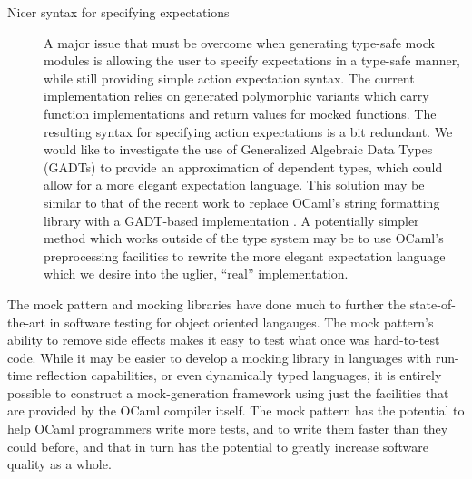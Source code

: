 \begin{description}
\item [Nicer syntax for specifying expectations]

  A major issue that must be overcome when generating type-safe mock
  modules is allowing the user to specify expectations in a type-safe
  manner, while still providing simple action expectation syntax. The
  current implementation relies on generated polymorphic variants
  which carry function implementations and return values for mocked
  functions. The resulting syntax for specifying action expectations
  is a bit redundant. We would like to investigate the use of
  Generalized Algebraic Data Types (GADTs) to provide an approximation
  of dependent types, which could allow for a more elegant expectation
  language. This solution may be similar to that of the recent work to
  replace OCaml's string formatting library with a GADT-based
  implementation \cite{vaugon:gadt-format}. A potentially simpler
  method which works outside of the type system may be to use OCaml's
  preprocessing facilities to rewrite the more elegant expectation
  language which we desire into the uglier, ``real'' implementation.



\end{description}

The mock pattern and mocking libraries have done much to further the
state-of-the-art in software testing for object oriented
langauges. The mock pattern's ability to remove side effects makes it
easy to test what once was hard-to-test code. While it may be easier
to develop a mocking library in languages with run-time reflection
capabilities, or even dynamically typed languages, it is entirely
possible to construct a mock-generation framework using just the
facilities that are provided by the OCaml compiler itself. The mock
pattern has the potential to help OCaml programmers write more tests,
and to write them faster than they could before, and that in turn has
the potential to greatly increase software quality as a whole.
